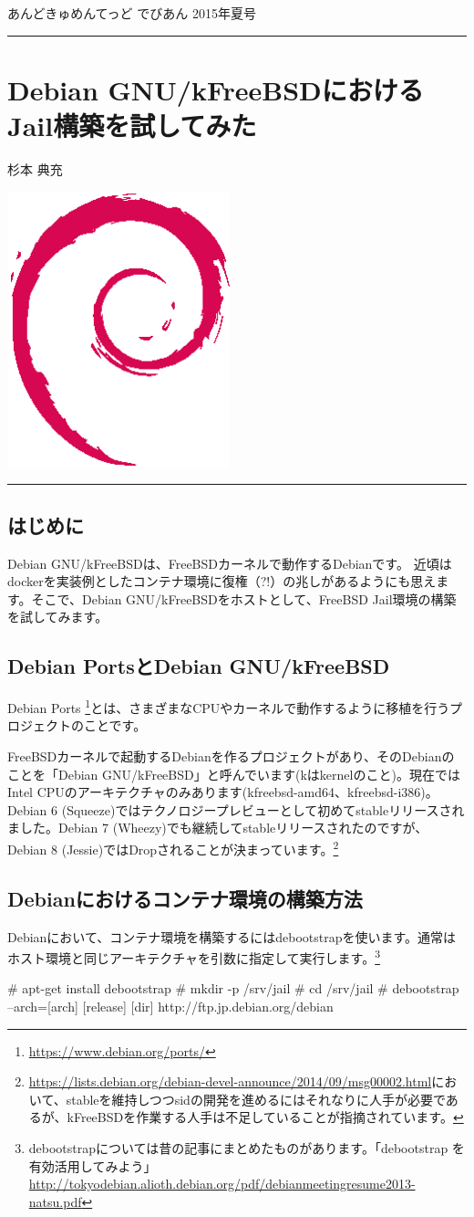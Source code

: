 \documentclass[mingoth,a4paper]{jsarticle}
\renewcommand{\dancersection}[2]{%
\newpage
あんどきゅめんてっど でびあん 2015年夏号
%
\vspace{0.1mm}\\
{\color{dancerdarkblue}\rule{\hsize}{2mm}}

%
%
\begin{minipage}[t]{0.6\hsize}
\color{dancerdarkblue}
\vspace{1cm}
\section{#1}
\hfill{}#2\\
\end{minipage}
\begin{minipage}[t]{0.4\hsize}
\vspace{-2cm}
\hfill{}\includegraphics[height=8cm]{image200502/openlogo-nd.eps}\\
\vspace{-5cm}
\end{minipage}
%
{\color{dancerlightblue}\rule{0.66\hsize}{2mm}}
%
\vspace{2cm}
}
\begin{document}
\dancersection{Debian GNU/kFreeBSDにおけるJail構築を試してみた}{杉本 典充}

\subsection{はじめに}

Debian GNU/kFreeBSDは、FreeBSDカーネルで動作するDebianです。
近頃はdockerを実装例としたコンテナ環境に復権（?!）の兆しがあるようにも思えます。そこで、Debian GNU/kFreeBSDをホストとして、FreeBSD Jail環境の構築を試してみます。

\subsection{Debian PortsとDebian GNU/kFreeBSD}

Debian Ports \footnote{\url{https://www.debian.org/ports/}}とは、さまざまなCPUやカーネルで動作するように移植を行うプロジェクトのことです。

FreeBSDカーネルで起動するDebianを作るプロジェクトがあり、そのDebianのことを「Debian GNU/kFreeBSD」と呼んでいます(kはkernelのこと)。現在ではIntel CPUのアーキテクチャのみあります(kfreebsd-amd64、kfreebsd-i386)。Debian 6 (Squeeze)ではテクノロジープレビューとして初めてstableリリースされました。Debian 7 (Wheezy)でも継続してstableリリースされたのですが、Debian 8 (Jessie)ではDropされることが決まっています。\footnote{\url{https://lists.debian.org/debian-devel-announce/2014/09/msg00002.html}において、stableを維持しつつsidの開発を進めるにはそれなりに人手が必要であるが、kFreeBSDを作業する人手は不足していることが指摘されています。}

\subsection{Debianにおけるコンテナ環境の構築方法}

Debianにおいて、コンテナ環境を構築するにはdebootstrapを使います。通常はホスト環境と同じアーキテクチャを引数に指定して実行します。\footnote{debootstrapについては昔の記事にまとめたものがあります。「debootstrap を有効活用してみよう」\url{http://tokyodebian.alioth.debian.org/pdf/debianmeetingresume2013-natsu.pdf}}

\begin{commandline}
# apt-get install debootstrap
# mkdir -p /srv/jail
# cd /srv/jail
# debootstrap --arch=[arch] [release] [dir] http://ftp.jp.debian.org/debian
\end{commandline}
\end{document}
